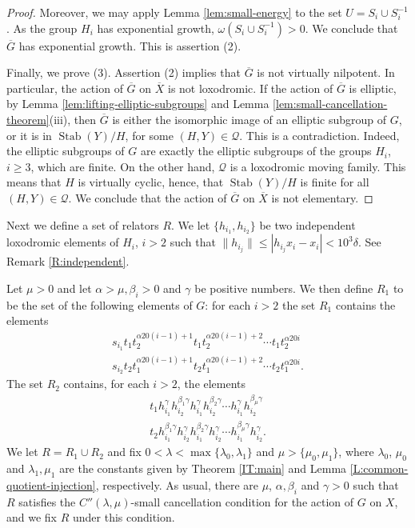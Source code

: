 \documentclass[leqno,a4paper,10pt]{amsart}
\theoremstyle{plain}
\theoremstyle{definition}
\theoremstyle{remark}
\newcommand{\stab}[1]{\operatorname{Stab}(#1)}
\begin{document}
\begin{proof}
Moreover, we may apply Lemma \ref{lem:small-energy} to the set $U=S_i\cup S_i^{-1}$. As the group $H_i$ has exponential growth, $\omega(S_i\cup S_i^{-1})>0$. We conclude that $\overline G$ has exponential growth. This is assertion (2).  

Finally, we prove (3). Assertion (2) implies that $\overline G$ is not virtually nilpotent. In particular, the action of $\overline G$ on $\overline X$ is not loxodromic. If the action of $\overline G$ is elliptic, by Lemma \ref{lem:lifting-elliptic-subgroups} and Lemma \ref{lem:small-cancellation-theorem}(iii), then $\overline G$ is either the isomorphic image of an elliptic subgroup of $G$, or it is in $\stab Y /H$, for some $(H,Y)\in \mathcal Q$. This is a contradiction. Indeed, the elliptic subgroups of $G$ are exactly the elliptic subgroups of the groups $H_i$, $i\geqslant 3$, which are finite. On the other hand, $\mathcal Q$ is a loxodromic moving family. This means that $H$ is virtually cyclic, hence, that $\stab Y/H$ is finite for all $(H,Y)\in \mathcal Q$. We conclude that the action of $\overline G$ on $\overline X$ is not elementary. 
\end{proof} 


Next we define a set of relators $R$. 
We let $\{h_{i_1},h_{i_2}\}$ be two independent loxodromic elements of $H_i$, $i>2$ such that $\|h_{i_j}\|\leqslant |h_{i_j}x_i-x_i| < 10^3\delta$. See Remark \ref{R:independent}. 

 Let $\mu>0$ and let $\alpha>\mu ,\beta_i>0$ and $\gamma$ be positive numbers. We then define $R_1$  to be the set of the following elements of $G$: for each $i>2$ the set $R_1$ contains the elements 
\begin{align*}
s_{i_1}t_1t_2^{\alpha  20(i-1) +1}t_1t_2^{\alpha 20(i-1) +2}\cdots t_1t_2^{\alpha 20i}\\
s_{i_2}t_2t_1^{\alpha 20(i-1) +1}t_2t_1^{\alpha 20(i-1) +2}\cdots t_2t_1^{\alpha 20i}.
\end{align*}
The set $R_2$ contains, for each $i>2$, the elements
\begin{align*}
t_{1}h_{i_1}^{\gamma}h_{i_2}^{\beta_1\gamma}h_{i_1}^{\gamma}h_{i_2}^{\beta_2\gamma}\cdots h_{i_1}^{\gamma}h_{i_2}^{\beta_\mu \gamma} \\
t_{2}h_{i_1}^{\beta_1\gamma}h_{i_2}^{\gamma}h_{i_1}^{\beta_2\gamma}h_{i_2}^{\gamma}\cdots h_{i_1}^{\beta_\mu \gamma}h_{i_2}^{\gamma}.
\end{align*}
We let $R=R_1\cup R_2$ and fix $0<\lambda<\max\{\lambda_0,\lambda_1\}$ and $\mu>\{\mu_0,\mu_1\}$, where $\lambda_0$, $\mu_0$ and $\lambda_1,\mu_1$ are the constants given by Theorem \ref{IT:main} and Lemma \ref{L:common-quotient-injection}, respectively. As usual, there are $\mu$, $\alpha,\beta_i$ and $\gamma>0$ such that $R$ satisfies the $C''(\lambda,\mu)$-small cancellation condition for the action of $G$ on $X$, and we fix $R$ under this condition. 
\end{document}
